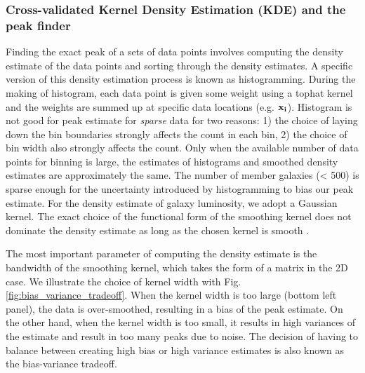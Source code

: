 \subsubsection{Cross-validated Kernel Density Estimation (KDE) and the peak finder} 
\label{subsubsec:KDE}
Finding the exact peak of a sets of data points 
involves computing the density estimate of the data points and sorting through
the density estimates. A specific version of this density estimation process is
known as histogramming. During the making of histogram, each data point is
given some weight using a tophat kernel and the weights are summed up at
specific data locations (e.g. $\bf{x}_i$). 
Histogram is not good for peak estimate for {\it sparse} data for two reasons: 1) the
choice of laying down the bin boundaries strongly affects the count in each bin, 2) the choice of
bin width also strongly affects the count. Only when the available number of data points
for binning is large, the estimates of histograms and smoothed density
estimates are approximately the same. The number of member galaxies (< 500) 
is sparse enough for the uncertainty introduced by histogramming to bias our
peak estimate. For the density estimate of galaxy luminosity, 
we adopt a Gaussian kernel. 
The exact choice of the functional form of the smoothing kernel does
not dominate the density estimate as long as the chosen kernel is
smooth \citep{Feigelson2014}. 

The most important parameter of computing the density estimate is the bandwidth
 of the smoothing kernel, which takes the form of a matrix in the 2D case. 
 We illustrate the choice of kernel width with Fig.
\ref{fig:bias_variance_tradeoff}. When the kernel width is
too large (bottom left panel), the data is over-smoothed, 
resulting in a bias of the peak estimate. On the other hand, when the kernel
width is too small, it results in high variances of the estimate and result in
too many peaks due to noise. The decision of having to balance between creating high
bias or high variance estimates is also known as the bias-variance tradeoff. 

